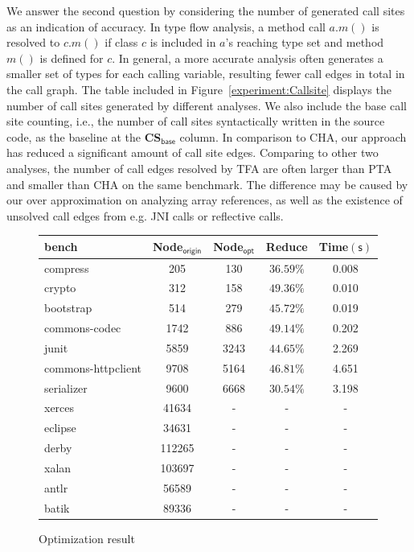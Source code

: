 \documentclass{llncs}
\begin{document}
We answer the second question by considering the number of generated call sites as an indication of accuracy. In type flow analysis, a method call $a.m()$ is resolved to $c.m()$ if class $c$ is included in $a$'s reaching type set and method $m()$ is defined for $c$. In general, a more accurate analysis often generates a smaller set of types for each calling variable, resulting fewer call edges in total in the call graph. The table included in Figure~\ref{experiment:Callsite} displays the number of call sites generated by different analyses. We also include the base call site counting, i.e., the number of call sites syntactically written in the source code, as the baseline at the \textbf{CS$_{\textsf{base}}$} column. In comparison to CHA, our approach has reduced a significant amount of call site edges.
Comparing to other two analyses, the number of call edges resolved by TFA are often larger than PTA and smaller than CHA on the same benchmark. The difference may be caused by our over approximation on analyzing array references, as well as the existence of unsolved call edges from e.g. JNI calls or reflective calls.


\begin{figure}[t!]
  \centering
\begin{tabular}{lcccc}
	\hline
	\textbf{bench} & \textbf{Node$_{\textsf{origin}}$} & \textbf{Node$_{\textsf{opt}}$} & \textbf{Reduce} & \hspace{2pt}\textbf{Time$(\textsf{s})$} \\
	\hline
	compress & 205 & 130 & $36.59\%$ & 0.008 \\
	crypto & 312 & 158 & $49.36\%$ & 0.010 \\
	bootstrap & 514 & 279 & $45.72\%$ & 0.019 \\
	commons-codec & 1742 & 886 & $49.14\%$ & 0.202 \\
	junit & 5859 & 3243 & $44.65\%$ & 2.269 \\
	commons-httpclient & 9708 & 5164 & $46.81\%$ & 4.651 \\
	serializer & 9600 & 6668 & $30.54\%$ & 3.198 \\
	xerces & 41634 & - & - & -\\
	eclipse & 34631 & - & - & -\\
	derby & 112265 & - & - & -\\
	xalan & 103697 & - & - & -\\
	antlr & 56589 & - & - & -\\
	batik & 89336 & - & - & -\\
	\hline
\end{tabular}
\caption{Optimization result}
\label{experiment:Optimalization}
\end{figure}
\end{document}
